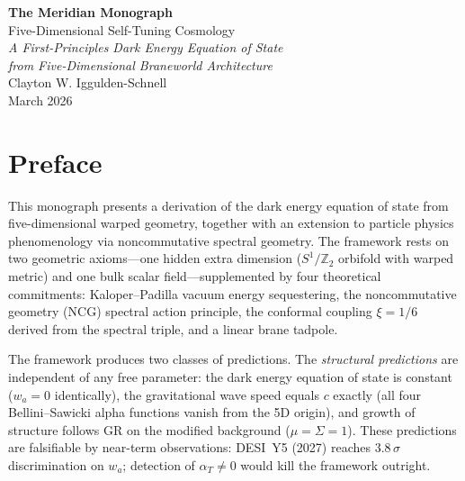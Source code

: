 \documentclass[10pt,a4paper,openany,twocolumn]{book}
\theoremstyle{definition}
\theoremstyle{remark}
\begin{document}
\onecolumn  %

\begin{titlepage}
\centering
\vspace*{2cm}

{\Huge\bfseries The Meridian Monograph}\\[0.8cm]
{\LARGE Five-Dimensional Self-Tuning Cosmology}\\[1.5cm]

{\large\itshape A First-Principles Dark Energy Equation of State\\
from Five-Dimensional Braneworld Architecture}\\[3cm]

{\Large Clayton W. Iggulden-Schnell}\\[2cm]

{\large March 2026}\\[1cm]

\vfill

\end{titlepage}

\frontmatter

\chapter*{Preface}

This monograph presents a derivation of the dark energy equation of state from five-dimensional warped geometry, together with an extension to particle physics phenomenology via noncommutative spectral geometry. The framework rests on two geometric axioms---one hidden extra dimension ($S^1/\mathbb{Z}_2$ orbifold with warped metric) and one bulk scalar field---supplemented by four theoretical commitments: Kaloper--Padilla vacuum energy sequestering, the noncommutative geometry (NCG) spectral action principle, the conformal coupling $\xi = 1/6$ derived from the spectral triple, and a linear brane tadpole.

The framework produces two classes of predictions. The \emph{structural predictions} are independent of any free parameter: the dark energy equation of state is constant ($w_a = 0$ identically), the gravitational wave speed equals $c$ exactly (all four Bellini--Sawicki alpha functions vanish from the 5D origin), and growth of structure follows GR on the modified background ($\mu = \Sigma = 1$). These predictions are falsifiable by near-term observations: DESI~Y5 (2027) reaches $3.8\,\sigma$ discrimination on $w_a$; detection of $\alpha_T \neq 0$ would kill the framework outright.
\end{document}
